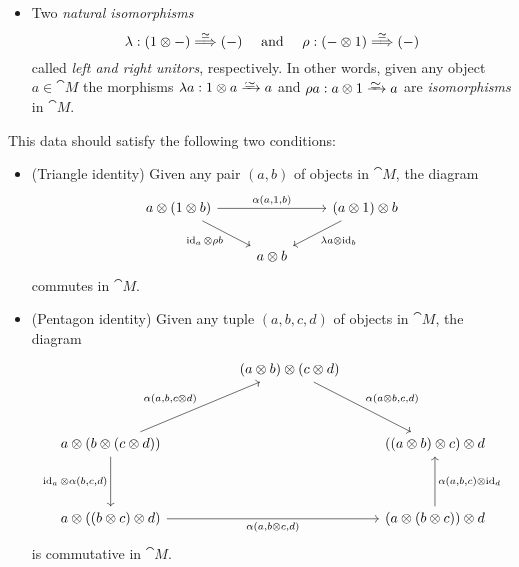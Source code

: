 \documentclass[../../deep-dive]{subfiles}
\begin{document}
\begin{definition}
\begin{itemize}
        \item Two \emph{natural isomorphisms}
              \[
                  \lambda: (1 \otimes -)
                  \overset{\simeq}\Longrightarrow (-)
                  \quad
                  \text{ and }
                  \quad
                  \rho: (- \otimes 1)
                  \overset{\simeq}\Longrightarrow (-)
              \]
              called \emph{left and right unitors}, respectively. In other words, given any
              object \(a \in \cat M\) the morphisms \(\lambda a: 1 \otimes a \isoto a\) and
              \(\rho a: a \otimes 1 \isoto a\) are \emph{isomorphisms} in \(\cat M\).
    \end{itemize}
    This data should satisfy the following two conditions:
    \begin{itemize}\setlength\itemsep{0em}
        \item (Triangle identity) Given any pair \((a, b)\) of objects in \(\cat M\),
              the diagram
              \[
                  \begin{tikzcd}
                      a \otimes (1 \otimes b) \ar[rr, "{\alpha(a, 1, b)}"]
                      \ar[rd, "\Id_a \otimes \rho b"']
                      & &(a \otimes 1) \otimes b \ar[ld, "\lambda a \otimes \Id_b"]
                      \\
                      &a \otimes b &
                  \end{tikzcd}
              \]
              commutes in \(\cat M\).

        \item (Pentagon identity) Given any tuple \((a, b, c, d)\) of objects in
              \(\cat M\), the diagram
              \[
                  \begin{tikzcd}
                      &
                      &(a \otimes b) \otimes (c \otimes d)
                      \ar[rdd, "{\alpha(a \otimes b, c, d)}"]
                      &
                      \\
                      & & &
                      \\
                      a \otimes (b \otimes (c \otimes d))
                      \ar[dd, "{\Id_a \otimes \alpha(b, c, d)}"']
                      \ar[rruu, "{\alpha(a, b, c \otimes d)}"]
                      &
                      &
                      &((a \otimes b) \otimes c) \otimes d
                      \\
                      & & &
                      \\
                      a \otimes ((b \otimes c) \otimes d)
                      \ar[rrr, "{\alpha(a, b \otimes c, d)}"']
                      &
                      &
                      &(a \otimes (b \otimes c)) \otimes d
                      \ar[uu, "{\alpha(a, b, c) \otimes \Id_d}"']
                  \end{tikzcd}
              \]
              is commutative in \(\cat M\).
    \end{itemize}
\end{definition}
\end{document}
